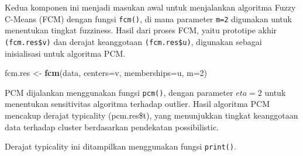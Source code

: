 \documentclass[
  oneside]{book}
\newenvironment{Shaded}{\begin{snugshade}}{\end{snugshade}}
\newcommand{\AttributeTok}[1]{\textcolor[rgb]{0.13,0.29,0.53}{#1}}
\newcommand{\DecValTok}[1]{\textcolor[rgb]{0.00,0.00,0.81}{#1}}
\newcommand{\FunctionTok}[1]{\textcolor[rgb]{0.13,0.29,0.53}{\textbf{#1}}}
\newcommand{\NormalTok}[1]{#1}
\newcommand{\OtherTok}[1]{\textcolor[rgb]{0.56,0.35,0.01}{#1}}
\newcommand{\SpecialCharTok}[1]{\textcolor[rgb]{0.81,0.36,0.00}{\textbf{#1}}}
\begin{document}
\begin{Shaded}
\end{Shaded}

Kedua komponen ini menjadi masukan awal untuk menjalankan algoritma Fuzzy C-Means (FCM) dengan fungsi \texttt{fcm()}, di mana parameter \texttt{m=2} digunakan untuk menentukan tingkat fuzziness. Hasil dari proses FCM, yaitu prototipe akhir \texttt{(fcm.res\$v)} dan derajat keanggotaan \texttt{(fcm.res\$u)}, digunakan sebagai inisialisasi untuk algoritma PCM.

\begin{Shaded}
\begin{Highlighting}[]
\NormalTok{fcm.res }\OtherTok{\textless{}{-}} \FunctionTok{fcm}\NormalTok{(data, }\AttributeTok{centers=}\NormalTok{v, }\AttributeTok{memberships=}\NormalTok{u, }\AttributeTok{m=}\DecValTok{2}\NormalTok{)}
\end{Highlighting}
\end{Shaded}

PCM dijalankan menggunakan fungsi \texttt{pcm()}, dengan parameter \(eta=2\) untuk menentukan sensitivitas algoritma terhadap outlier. Hasil algoritma PCM mencakup derajat typicality (pcm.res\$t), yang menunjukkan tingkat keanggotaan data terhadap cluster berdasarkan pendekatan possibilistic.

\begin{Shaded}
\end{Shaded}

Derajat typicality ini ditampilkan menggunakan fungsi \texttt{print()}.
\end{document}
